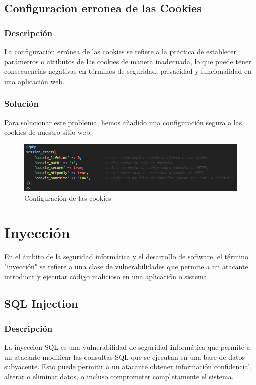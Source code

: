 \documentclass{report}
\begin{document}
            \subsection{Configuracion erronea de las Cookies}
                \subsubsection{Descripción}
                    La configuración errónea de las cookies se refiere a la práctica de establecer parámetros o atributos de las cookies de manera inadecuada, lo que puede tener consecuencias negativas en términos de seguridad, privacidad y funcionalidad en una aplicación web.                
                \subsubsection{Solución}
                    Para solucionar este problema, hemos añadido una configuración segura a las cookies de nuestro sitio web.
                    \begin{figure}[H]
                        \centering
                        \includegraphics[width=\textwidth]{./img/vulnerabilidades/3.2/3.1.png}
                        \caption{Configuración de las cookies}
                    \end{figure}
            \clearpage
        \section{Inyección}
            En el ámbito de la seguridad informática y el desarrollo de software, el término "inyección" se refiere a una clase de vulnerabilidades que permite a un atacante introducir y ejecutar código malicioso en una aplicación o sistema. 
            \subsection{SQL Injection}
                \subsubsection{Descripción}
                    La inyección SQL es una vulnerabilidad de seguridad informática que permite a un atacante modificar las consultas SQL que se ejecutan en una base de datos subyacente. Esto puede permitir a un atacante obtener información confidencial, alterar o eliminar datos, o incluso comprometer completamente el sistema.
\end{document}
